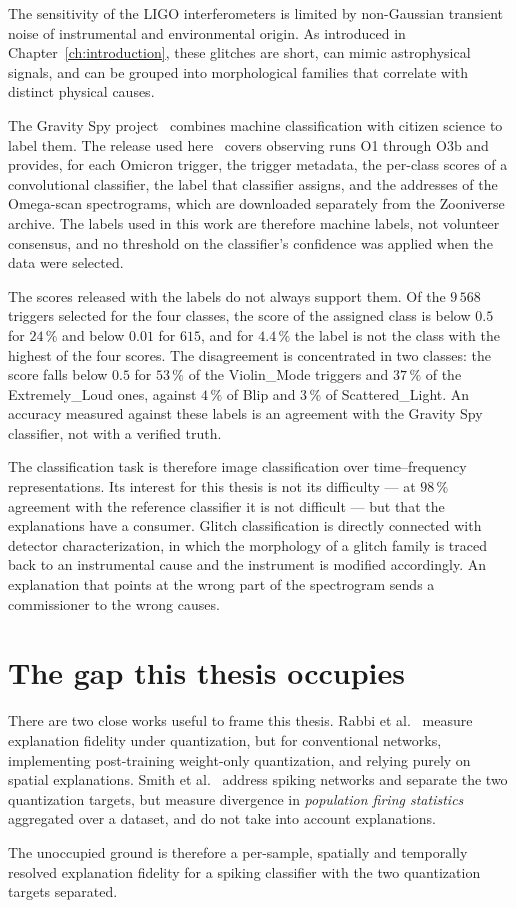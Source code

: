 The sensitivity of the LIGO interferometers is limited by non-Gaussian transient
noise of instrumental and environmental origin. As introduced in
Chapter~\ref{ch:introduction}, these glitches are short, can mimic astrophysical
signals, and can be grouped into morphological families that correlate with
distinct physical causes.

The Gravity Spy project~\cite{zevin2017, bahaadini2018} combines machine
classification with citizen science to label them. The release used
here~\cite{glanzer2021} covers observing runs O1 through O3b and provides, for
each Omicron trigger, the trigger metadata, the per-class scores of a
convolutional classifier, the label that classifier assigns, and the addresses
of the Omega-scan spectrograms, which are downloaded separately from the
Zooniverse archive. The labels used in this work are therefore machine labels,
not volunteer consensus, and no threshold on the classifier's confidence was
applied when the data were selected.

The scores released with the labels do not always support them. Of the
$9\,568$ triggers selected for the four classes, the score of the assigned class
is below $0.5$ for $24\,\%$ and below $0.01$ for $615$, and for $4.4\,\%$ the
label is not the class with the highest of the four scores. The disagreement is
concentrated in two classes: the score falls below $0.5$ for $53\,\%$ of the
Violin\_Mode triggers and $37\,\%$ of the Extremely\_Loud ones, against $4\,\%$
of Blip and $3\,\%$ of Scattered\_Light. An accuracy measured against these
labels is an agreement with the Gravity Spy classifier, not with a verified
truth.

The classification task is therefore image classification over time--frequency
representations. Its interest for this thesis is not its difficulty --- at
$98\,\%$ agreement with the reference classifier it is not difficult --- but
that the explanations have a consumer. Glitch classification is directly
connected with detector characterization, in which the
morphology of a glitch family is traced back to an instrumental cause and the
instrument is modified accordingly. An explanation that points at the wrong part of the
spectrogram sends a commissioner to the wrong causes.

\section{The gap this thesis occupies}
\label{sec:gap}

There are two close works useful to frame this thesis. Rabbi et
al.~\cite{rabbi2026} measure explanation fidelity under quantization, but for
conventional networks, implementing post-training weight-only quantization, and relying purely
on spatial explanations. Smith et al.~\cite{smith2026} address spiking networks and
separate the two quantization targets, but measure divergence in \emph{population
firing statistics} aggregated over a dataset, and do not take into account explanations.

The unoccupied ground is therefore a per-sample, spatially and temporally resolved
explanation fidelity for a spiking classifier with the two quantization targets
separated.